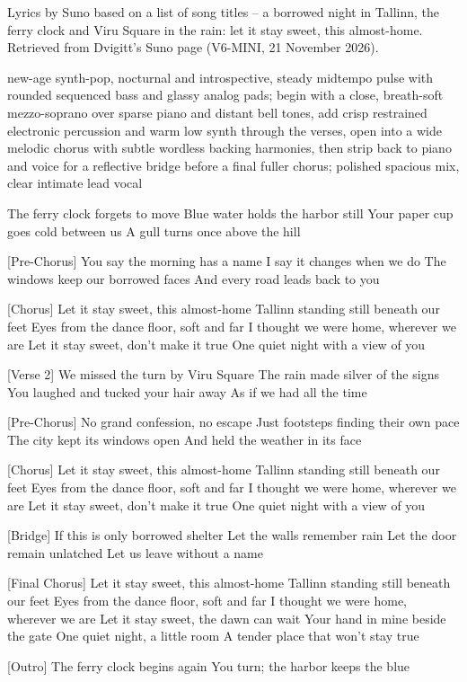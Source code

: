 \begin{notes}
Lyrics by Suno based on a list of song titles -- a borrowed night in Tallinn, the ferry clock and Viru Square in the rain: let it stay sweet, this almost-home. Retrieved from Dvigitt's Suno page (V6-MINI, 21 November 2026).
\end{notes}
\begin{style}
new-age synth-pop, nocturnal and introspective, steady midtempo pulse with rounded sequenced bass and glassy analog pads; begin with a close, breath-soft mezzo-soprano over sparse piano and distant bell tones, add crisp restrained electronic percussion and warm low synth through the verses, open into a wide melodic chorus with subtle wordless backing harmonies, then strip back to piano and voice for a reflective bridge before a final fuller chorus; polished spacious mix, clear intimate lead vocal
\end{style}
\begin{lyrics}
[Verse 1]
The ferry clock forgets to move
Blue water holds the harbor still
Your paper cup goes cold between us
A gull turns once above the hill

[Pre-Chorus]
You say the morning has a name
I say it changes when we do
The windows keep our borrowed faces
And every road leads back to you

[Chorus]
Let it stay sweet, this almost-home
Tallinn standing still beneath our feet
Eyes from the dance floor, soft and far
I thought we were home, wherever we are
Let it stay sweet, don't make it true
One quiet night with a view of you

[Verse 2]
We missed the turn by Viru Square
The rain made silver of the signs
You laughed and tucked your hair away
As if we had all the time

[Pre-Chorus]
No grand confession, no escape
Just footsteps finding their own pace
The city kept its windows open
And held the weather in its face

[Chorus]
Let it stay sweet, this almost-home
Tallinn standing still beneath our feet
Eyes from the dance floor, soft and far
I thought we were home, wherever we are
Let it stay sweet, don't make it true
One quiet night with a view of you

[Bridge]
If this is only borrowed shelter
Let the walls remember rain
Let the door remain unlatched
Let us leave without a name

[Final Chorus]
Let it stay sweet, this almost-home
Tallinn standing still beneath our feet
Eyes from the dance floor, soft and far
I thought we were home, wherever we are
Let it stay sweet, the dawn can wait
Your hand in mine beside the gate
One quiet night, a little room
A tender place that won't stay true

[Outro]
The ferry clock begins again
You turn; the harbor keeps the blue
\end{lyrics}

